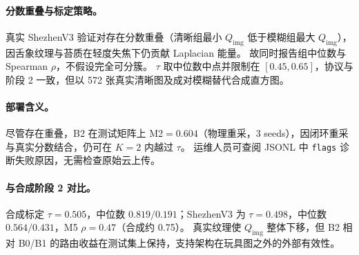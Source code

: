 \paragraph{分数重叠与标定策略。}
真实 ShezhenV3 验证对存在分数重叠（清晰组最小 $Q_{\mathrm{img}}$ 低于模糊组最大 $Q_{\mathrm{img}}$），因舌象纹理与苔质在轻度失焦下仍贡献 Laplacian 能量。
故同时报告组中位数与 Spearman $\rho$，不假设完全可分簇。
$\tau$ 取中位数中点并限制在 $[0.45,0.65]$，协议与阶段 2 一致，但以 572 张真实清晰图及成对模糊替代合成直方图。

\paragraph{部署含义。}
尽管存在重叠，B2 在测试矩阵上 M2$=0.604$（物理重采，3 seeds），因闭环重采与真实分数结合，仍可在 $K{=}2$ 内越过 $\tau$。
运维人员可查阅 JSONL 中 \texttt{flags} 诊断失败原因，无需检查原始云上传。

\paragraph{与合成阶段 2 对比。}
合成标定 $\tau{=}0.505$，中位数 $0.819/0.191$；ShezhenV3 为 $\tau{=}0.498$，中位数 $0.564/0.431$，M5 $\rho{=}0.47$（合成约 0.75）。
真实纹理使 $Q_{\mathrm{img}}$ 整体下移，但 B2 相对 B0/B1 的路由收益在测试集上保持，支持架构在玩具图之外的外部有效性。
